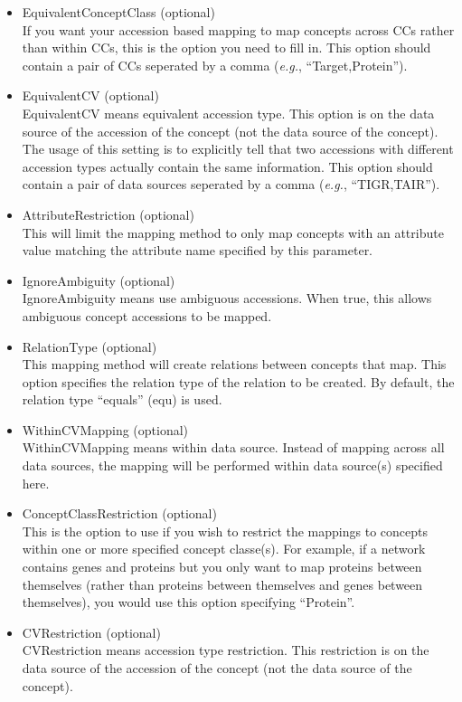 \begin{itemize}
  
  \item{EquivalentConceptClass (optional)}\\
  If you want your accession based mapping to map concepts across CCs rather than within CCs, 
  this is the option you need to fill in.
  This option should contain a pair of CCs seperated by a comma ({\it{e.g.}}, ``Target,Protein'').
  
  \item{EquivalentCV (optional)}\\
  EquivalentCV means equivalent accession type.
  This option is on the data source of the accession of the concept (not the data source of the concept).
  The usage of this setting is to explicitly tell that two accessions with different accession types actually contain the same information.
  This option should contain a pair of data sources seperated by a comma ({\it{e.g.}}, ``TIGR,TAIR'').
  
  \item{AttributeRestriction (optional)}\\
  This will limit the mapping method to only map concepts with an attribute value matching
  the attribute name specified by this parameter.
  
  \item{IgnoreAmbiguity (optional)}\\
  IgnoreAmbiguity means use ambiguous accessions.
  When true, this allows ambiguous concept accessions to be mapped.
  
  \item{RelationType (optional)}\\
  This mapping method will create relations between concepts that map.
  This option specifies the relation type of the relation to be created.
  By default, the relation type ``equals'' (equ) is used.
  
  \item{WithinCVMapping (optional)}\\
  WithinCVMapping means within data source.
  Instead of mapping across all data sources, the mapping will be performed within data source(s) specified here.
  
  \item{ConceptClassRestriction (optional)}\\
  This is the option to use if you wish to restrict the mappings to concepts within one or more specified concept classe(s).
  For example, if a network contains genes and proteins but you only want to map proteins between themselves 
  (rather than proteins between themselves and genes between themselves), you would use this option specifying ``Protein''.
  
  \item{CVRestriction (optional)}\\
  CVRestriction means accession type restriction.
  This restriction is on the data source of the accession of the concept (not the data source of the concept).

\end{itemize}
    

